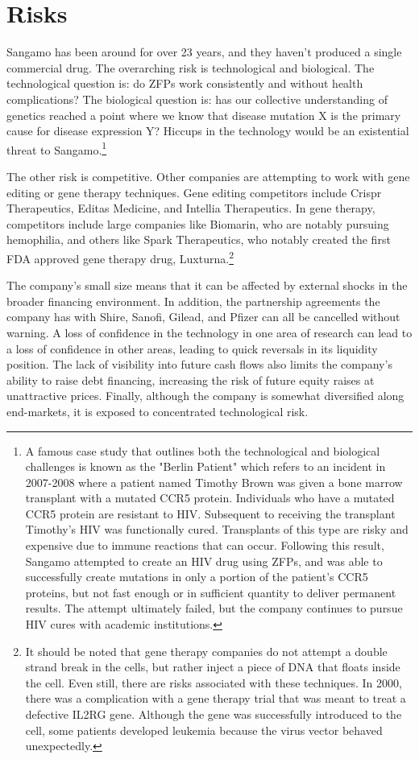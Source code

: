 \documentclass{article} %
\begin{document}
\section{Risks} 
Sangamo has been around for over 23 years, and they haven't produced a single commercial drug. The overarching risk is technological and biological. The technological question is: do ZFPs work consistently and without health complications? The biological question is: has our collective understanding of genetics reached a point where we know that disease mutation X is the primary cause for disease expression Y? Hiccups in the technology would be an existential threat to Sangamo.\footnote{A famous case study that outlines both the technological and biological challenges is known as the "Berlin Patient" which refers to an incident in 2007-2008 where a patient named Timothy Brown was given a bone marrow transplant with a mutated CCR5 protein. Individuals who have a mutated CCR5 protein are resistant to HIV.  Subsequent to receiving the transplant Timothy's HIV was functionally cured. Transplants of this type are risky and expensive due to immune reactions that can occur. Following this result, Sangamo attempted to create an HIV drug using ZFPs, and was able to successfully create mutations in only a portion of the patient's CCR5 proteins, but not fast enough or in sufficient quantity to deliver permanent results. The attempt ultimately failed, but the company continues to pursue HIV cures with academic institutions.}

The other risk is competitive. Other companies are attempting to work with gene editing or gene therapy techniques. Gene editing competitors include Crispr Therapeutics, Editas Medicine, and Intellia Therapeutics. In gene therapy, competitors include large companies like Biomarin, who are notably pursuing hemophilia, and others like Spark Therapeutics, who notably created the first FDA approved gene therapy drug, Luxturna.\footnote{It should be noted that gene therapy companies do not attempt a double strand break in the cells, but rather inject a piece of DNA that floats inside the cell. Even still, there are risks associated with these techniques. In 2000, there was a complication with a gene therapy trial that was meant to treat a defective IL2RG gene. Although the gene was successfully introduced to the cell, some patients developed leukemia because the virus vector behaved unexpectedly.} 

The company's small size means that it can be affected by external shocks in the broader financing environment. In addition, the partnership agreements the company has with Shire, Sanofi, Gilead, and Pfizer can all be cancelled without warning. A loss of confidence in the technology in one area of research can lead to a loss of confidence in other areas, leading to quick reversals in its liquidity position. The lack of visibility into future cash flows also limits the company's ability to raise debt financing, increasing the risk of future equity raises at unattractive prices. Finally, although the company is somewhat diversified along end-markets, it is exposed to concentrated technological risk.



\end{document}
